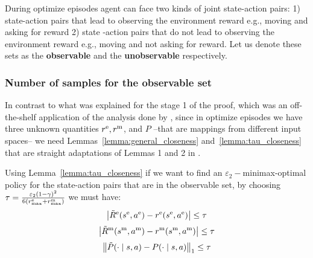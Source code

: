 During optimize episodes agent can face two kinds of joint state-action pairs: 1) state-action pairs that lead to observing the environment reward e.g., moving and asking for reward 2) state -action pairs that do not lead to observing the environment reward e.g., moving and not asking for reward. Let us denote these sets as the \textbf{observable} and the \textbf{unobservable} respectively.

\subsubsection*{Number of samples for the observable set}
In contrast to what was explained for the stage 1 of the proof, which was an off-the-shelf application of the analysis done by \citet{strehl2008analysis}, since in optimize episodes we have three unknown quantities $r^\text{e}, r^\text{m}$, and $P$ --that are mappings from different input spaces-- we need Lemmas~\ref{lemma:general_closeness} and~\ref{lemma:tau_closeness} that are straight adaptations of Lemmas 1 and 2 in \citet{strehl2008analysis}.

Using Lemma~\ref{lemma:tau_closeness} if we want to find an $\varepsilon_2-$minimax-optimal policy for the state-action pairs that are in the observable set, by choosing $\tau = \frac{\varepsilon_2(1 - \gamma)^2}{6(r_{\text{max}}^\text{e} + r_{\text{max}}^\text{m})}$ we must have:
\begin{equation*}
    \left \lvert \tilde{R}^\text{e}(s^\text{e}, a^\text{e}) - r^\text{e}(s^\text{e}, a^\text{e}) \right \rvert \leq \tau
\end{equation*}
\begin{equation*}
    \left \lvert \tilde{R}^\text{m}(s^\text{m}, a^\text{m}) - r^\text{m}(s^\text{m}, a^\text{m}) \right \rvert \leq \tau
\end{equation*}
\begin{equation*}
    \left \lVert \tilde{P}(\cdot \mid s, a) - P(\cdot \mid s, a) \right \rVert_1 \leq \tau
\end{equation*}

